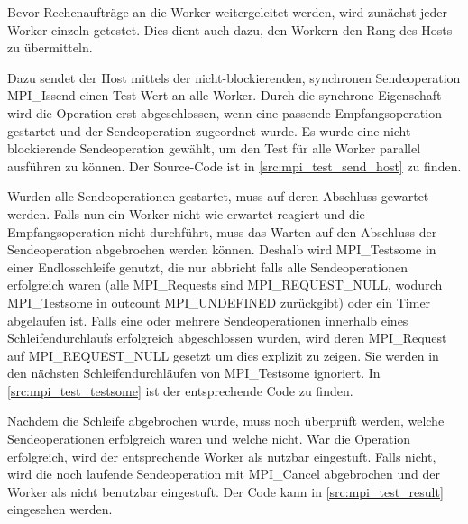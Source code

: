 Bevor Rechenaufträge an die Worker weitergeleitet werden, wird zunächst jeder Worker einzeln getestet. Dies dient auch dazu, den Workern den Rang des Hosts zu übermitteln.

Dazu sendet der Host mittels der nicht-blockierenden, synchronen Sendeoperation MPI\_Issend einen Test-Wert an alle Worker. Durch die synchrone Eigenschaft wird die Operation erst abgeschlossen, wenn eine passende Empfangsoperation gestartet und der Sendeoperation zugeordnet wurde. Es wurde eine nicht-blockierende Sendeoperation gewählt, um den Test für alle Worker parallel ausführen zu können. Der Source-Code ist in \autoref{src:mpi_test_send_host} zu finden.

Wurden alle Sendeoperationen gestartet, muss auf deren Abschluss gewartet werden. Falls nun ein Worker nicht wie erwartet reagiert und die Empfangsoperation nicht durchführt, muss das Warten auf den Abschluss der Sendeoperation abgebrochen werden können. Deshalb wird MPI\_Testsome in einer Endlosschleife genutzt, die nur abbricht falls alle Sendeoperationen erfolgreich waren (alle MPI\_Requests sind MPI\_REQUEST\_NULL, wodurch MPI\_Testsome in outcount MPI\_UNDEFINED zurückgibt) oder ein Timer abgelaufen ist. Falls eine oder mehrere Sendeoperationen innerhalb eines Schleifendurchlaufs erfolgreich abgeschlossen wurden, wird deren MPI\_Request auf MPI\_REQUEST\_NULL gesetzt um dies explizit zu zeigen. Sie werden in den nächsten Schleifendurchläufen von MPI\_Testsome ignoriert. In \autoref{src:mpi_test_testsome} ist der entsprechende Code zu finden.

Nachdem die Schleife abgebrochen wurde, muss noch überprüft werden, welche Sendeoperationen erfolgreich waren und welche nicht. War die Operation erfolgreich, wird der entsprechende Worker als nutzbar eingestuft. Falls nicht, wird die noch laufende Sendeoperation mit MPI\_Cancel abgebrochen und der Worker als nicht benutzbar eingestuft. Der Code kann in \autoref{src:mpi_test_result} eingesehen werden.

\begin{figure}[h!]
	
\end{figure}

\begin{figure}[h!]
	
\end{figure}

